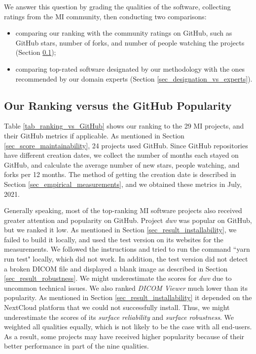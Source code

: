 We answer this question by grading the qualities of the software, collecting ratings from the MI community, then conducting two comparisons:
\begin{itemize}
\item comparing our ranking with the community ratings on GitHub, such as GitHub stars, number of forks, and number of people watching the projects (Section \ref{sec_ranking_vs_github});
\item comparing top-rated software designated by our methodology with the ones recommended by our domain experts (Section \ref{sec_designation_vs_experts}).
\end{itemize}

\subsection{Our Ranking versus the GitHub Popularity}
\label{sec_ranking_vs_github}

Table \ref{tab_ranking_vs_GitHub} shows our ranking to the 29 MI projects, and their GitHub metrics if applicable. As mentioned in Section \ref{sec_score_maintainability}, 24 projects used GitHub. Since GitHub repositories have different creation dates, we collect the number of months each stayed on GitHub, and calculate the average number of new stars, people watching, and forks per 12 months. The method of getting the creation date is described in Section \ref{sec_empirical_measurements}, and we obtained these metrics in July, 2021.

Generally speaking, most of the top-ranking MI software projects also received greater attention and popularity on GitHub. Project \textit{dwv} was popular on GitHub, but we ranked it low. As mentioned in Section \ref{sec_result_installability}, we failed to build it locally, and used the test version on its websites for the measurements. We followed the instructions and tried to run the command ``yarn run test" locally, which did not work. In addition, the test version did not detect a broken DICOM file and displayed a blank image as described in Section \ref{sec_result_robustness}. We might underestimate the scores for \textit{dwv} due to uncommon technical issues. We also ranked \textit{DICOM Viewer} much lower than its popularity. As mentioned in Section \ref{sec_result_installability} it depended on the NextCloud platform that we could not successfully install. Thus, we might underestimate the scores of its \textit{surface reliability} and \textit{surface robustness}. We weighted all qualities equally, which is not likely to be the case with all end-users. As a result, some projects may have received higher popularity because of their better performance in part of the nine qualities.

